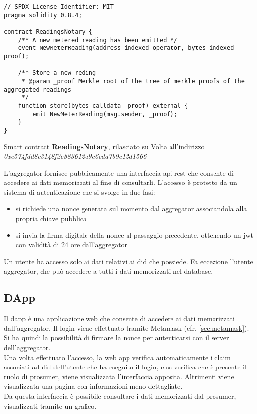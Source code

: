 \begin{listing}[h]
    \begin{verbatim}
// SPDX-License-Identifier: MIT
pragma solidity 0.8.4;

contract ReadingsNotary {
    /** A new metered reading has been emitted */
    event NewMeterReading(address indexed operator, bytes indexed proof);

    /** Store a new reding
     * @param _proof Merkle root of the tree of merkle proofs of the aggregated readings
     */
    function store(bytes calldata _proof) external {
        emit NewMeterReading(msg.sender, _proof);
    }
}
\end{verbatim}
    \caption{Smart contract \textbf{ReadingsNotary}, rilasciato su Volta all'indirizzo \textit{0xe574fdd8c3148f2e883612a9c6cda7b9c12d1566}}\label{lab:readings-notary}
\end{listing}

L'\gls{aggregator} fornisce pubblicamente una interfaccia \gls{api} \gls{rest} che consente di accedere ai dati memorizzati al fine di consultarli.
L'accesso è protetto da un sistema di autenticazione che si svolge in due fasi:
\begin{itemize}
    \item si richiede una nonce generata sul momento dal \gls{aggregator} associandola alla propria chiave pubblica
    \item si invia la firma digitale della nonce al passaggio precedente, ottenendo un \gls{jwt} con validità di 24 ore dall'\gls{aggregator}
\end{itemize}

Un utente ha accesso solo ai dati relativi ai \gls{did} che possiede.
Fa eccezione l'utente \gls{aggregator}, che può accedere a tutti i dati memorizzati nel database.

\subsection{DApp}
Il \gls{dapp} è una applicazione web che consente di accedere ai dati memorizzati dall'\gls{aggregator}.
Il login viene effettuato tramite Metamask (cfr. \autoref{sec:metamask}).
Si ha quindi la possibilità di firmare la nonce per autenticarsi con il server dell'\gls{aggregator}. \\
Una volta effettuato l'accesso, la web app verifica automaticamente i claim associati ad \gls{did} dell'utente
che ha eseguito il login, e se verifica che è presente il ruolo di \gls{prosumer}, viene visualizzata l'interfaccia apposita.
Altrimenti viene visualizzata una pagina con informazioni meno dettagliate. \\
Da questa interfaccia è possibile consultare i dati memorizzati dal prosumer, visualizzati tramite un grafico.

